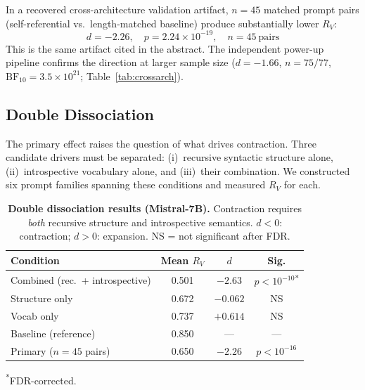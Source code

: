 \documentclass{article}
\newcommand{\RV}{R_V}
\newcommand{\dcohen}{d}
\begin{document}
In a recovered cross-architecture validation artifact, $n = 45$ matched prompt pairs
(self-referential vs.\ length-matched baseline) produce substantially lower $\RV$:
\begin{equation}
\dcohen = -2.26, \quad p = 2.24 \times 10^{-19}, \quad n = 45\ \text{pairs}
\label{eq:primary}
\end{equation}
This is the same artifact cited in the abstract.
The independent power-up pipeline confirms the direction at larger sample size
($\dcohen = -1.66$, $n = 75/77$, $\mathrm{BF}_{10} = 3.5 \times 10^{21}$;
Table~\ref{tab:crossarch}).

\subsection{Double Dissociation}
\label{sec:dissociation}


The primary effect raises the question of what drives contraction.
Three candidate drivers must be separated: (i)~recursive syntactic structure alone,
(ii)~introspective vocabulary alone, and (iii)~their combination.
We constructed six prompt families spanning these conditions and measured $\RV$ for each.

\begin{table}[h]
\centering
\caption{\textbf{Double dissociation results (Mistral-7B).}
         Contraction requires \emph{both} recursive structure and introspective semantics.
         $\dcohen < 0$: contraction; $\dcohen > 0$: expansion. NS = not significant after FDR.}
\label{tab:dissociation}
\smallskip
\small
\begin{tabular}{lccc}
\toprule
\textbf{Condition} & \textbf{Mean $\RV$} & \textbf{$\dcohen$} & \textbf{Sig.} \\
\midrule
Combined (rec.\ + introspective) & 0.501 & $-2.63$ & $p < 10^{-10}$\textsuperscript{*} \\
Structure only             & 0.672 & $-0.062$ & NS \\
Vocab only                 & 0.737 & $+0.614$ & NS \\
\midrule
Baseline (reference)       & 0.850 & --- & --- \\
Primary ($n = 45$ pairs) & 0.650 & $-2.26$ & $p < 10^{-16}$ \\
\bottomrule
\end{tabular}

\vspace{1mm}\raggedright\footnotesize\textsuperscript{*}FDR-corrected.
\end{table}
\end{document}
